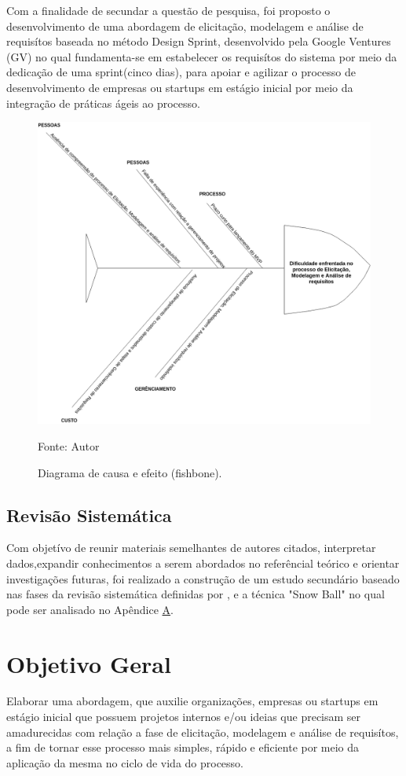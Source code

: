 Com a finalidade de secundar a questão de pesquisa, foi proposto o desenvolvimento de uma abordagem de elicitação, modelagem e análise de requisítos baseada no método Design Sprint, desenvolvido pela Google Ventures (GV) no qual fundamenta-se em estabelecer os requisítos do sistema por meio da dedicação de uma sprint(cinco dias), para apoiar e agilizar o processo de desenvolvimento de empresas ou startups em estágio inicial por meio da integração de práticas ágeis ao processo.
\newpage
\begin{figure}[h]
\centering
\label{fig01}
\includegraphics[keepaspectratio=true,scale=0.4]{figuras/Untitled_Diagram.png}
\caption{Diagrama de causa e efeito (fishbone).}
{Fonte: Autor}
\end{figure}
\newpage
\subsection{Revisão Sistemática}

Com objetívo de reunir materiais semelhantes de autores citados, interpretar dados,expandir conhecimentos a serem abordados no referêncial teórico e orientar investigações futuras, foi realizado a construção de um estudo secundário baseado nas fases da revisão sistemática definidas por \cite{kitchenham2004procedures}, \cite{brereton2007lessons} e a técnica "Snow Ball" no qual pode ser analisado no Apêndice \hyperlink{A}{A}.

\section{Objetivo Geral}
Elaborar uma abordagem, que auxilie organizações, empresas ou startups em estágio inicial que possuem projetos internos e/ou ideias que precisam ser amadurecidas com relação a fase de elicitação, modelagem e análise de requisítos, a fim de tornar esse processo mais simples, rápido e eficiente por meio da aplicação da mesma no ciclo de vida do processo.

